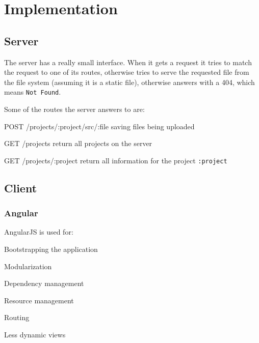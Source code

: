 
\section{Implementation}
\label{implementation}


\subsection{Server}

The server has a really small interface.
When it gets a request it tries to match the request to one of its routes, otherwise tries to serve the requested file from the file system (assuming it is a static file), otherwise answers with a 404, which means \texttt{Not Found}.

Some of the routes the server answers to are:
\begin{description*}
  \item[POST /projects/:project/src/:file]
    saving files being uploaded
  \item[GET /projects]
    return all projects on the server
  \item[GET /projects/:project]
    return all information for the project \texttt{:project}
\end{description*}

\subsection{Client}


\subsubsection{Angular}
\label{angular}

AngularJS is used for:

\begin{itemize*}
  \item Bootstrapping the application
  \item Modularization
  \item Dependency management
  \item Resource management
  \item Routing
  \item Less dynamic views
\end{itemize*}

